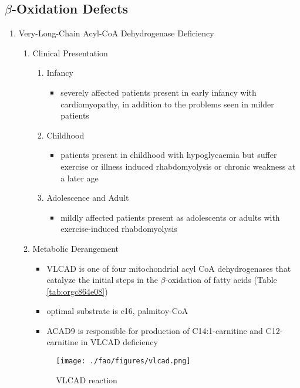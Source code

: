 \documentclass{scrartcl}
\begin{document}
\subsection{\(\beta\)-Oxidation Defects}
\label{sec:orgc38916f}
\begin{enumerate}
\item Very-Long-Chain Acyl-CoA Dehydrogenase Deficiency
\label{sec:org689d3db}
\begin{enumerate}
\item Clinical Presentation
\label{sec:org6dc8060}
\begin{enumerate}
\item Infancy
\label{sec:org5a8d33b}
\begin{itemize}
\item severely affected patients present in early infancy with
cardiomyopathy, in addition to the problems seen in milder patients
\end{itemize}
\item Childhood
\label{sec:org025858e}
\begin{itemize}
\item patients present in childhood with hypoglycaemia but suffer exercise
or illness induced rhabdomyolysis or chronic weakness at a later age
\end{itemize}
\item Adolescence and Adult
\label{sec:org0067068}
\begin{itemize}
\item mildly affected patients present as adolescents or adults with
exercise-induced rhabdomyolysis
\end{itemize}
\end{enumerate}
\item Metabolic Derangement
\label{sec:orge50ced0}
\begin{itemize}
\item VLCAD is one of four mitochondrial acyl CoA dehydrogenases that
catalyze the initial steps in the \(\beta\)-oxidation of fatty acids
(Table \ref{tab:orgc864e08})
\item optimal substrate is c16, palmitoy-CoA
\item ACAD9 is responsible for production of C14:1-carnitine and
C12-carnitine in VLCAD deficiency
\end{itemize}
\begin{figure}[htbp]
\centering
\texttt{[image: ./fao/figures/vlcad.png]}
\caption{\label{fig:org7d6fecf}
VLCAD reaction}
\end{figure}


\end{enumerate}
\end{enumerate}
\end{document}

